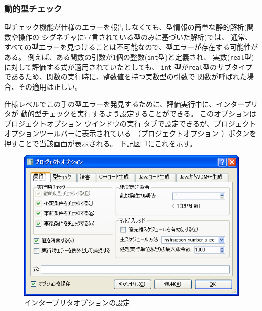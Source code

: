 \documentclass[\pformat,12pt]{jarticle}
\newcommand{\aaa}{\tt }
\newcommand{\guicmd}[1]{{\gt #1}}
\begin{document}

\subsubsection{動的型チェック}

型チェック機能が仕様のエラーを報告しなくても、型情報の簡単な静的解析(関数や操作の
シグネチャに宣言されている型のみに基づいた解析)では、
通常、すべての型エラーを見つけることは不可能なので、型エラーが存在する可能性がある。
例えば、ある関数の引数が1個の整数({\aaa int}型)と定義され、
実数({\aaa real}型)に対して評価する式が適用されていたとしても、
{\aaa int} 型が{\aaa real}型のサブタイプであるため、関数の実行時に、整数値を持つ実数型の引数で
関数が呼ばれた場合、その適用は正しい。

仕様レベルでこの手の型エラーを発見するために、評価実行中に、インタープリタが
動的型チェックを実行するよう設定することができる。
このオプションは\guicmd{プロジェクトオプション} ウインドウの\guicmd{実行} タブで設定できるが、プロジェクト
オプションツールバーに表示されている 
 （\guicmd{プロジェクトオプション} ）ボタンを押すことで当該画面が表示される。
下記図~\ref{fig:interoptions}にこれを示す。

\begin{figure}[tbh]
\begin{center}
\includegraphics[width=12.5cm]{interpreterOptions-pp.png}
\caption{インタープリタオプションの設定}
\label{fig:interoptions}
\end{center}
\end{figure}
\end{document}
